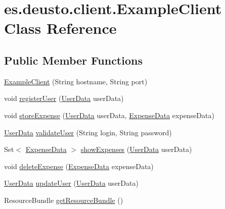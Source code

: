 \hypertarget{classes_1_1deusto_1_1client_1_1_example_client}{}\section{es.\+deusto.\+client.\+Example\+Client Class Reference}
\label{classes_1_1deusto_1_1client_1_1_example_client}
\subsection*{Public Member Functions}
\begin{DoxyCompactItemize}
\item 
\hyperlink{classes_1_1deusto_1_1client_1_1_example_client_afe4bf9d0ff661de1e0ba936df0ce807f}{Example\+Client} (String hostname, String port)
\item 
void \hyperlink{classes_1_1deusto_1_1client_1_1_example_client_a1c17371c17dde2b7664f2ad17ee79e4b}{register\+User} (\hyperlink{classes_1_1deusto_1_1serialization_1_1_user_data}{User\+Data} user\+Data)
\item 
void \hyperlink{classes_1_1deusto_1_1client_1_1_example_client_aba5fe3dfb882ef22d0bd49b5915871d3}{store\+Expense} (\hyperlink{classes_1_1deusto_1_1serialization_1_1_user_data}{User\+Data} user\+Data, \hyperlink{classes_1_1deusto_1_1serialization_1_1_expense_data}{Expense\+Data} expense\+Data)
\item 
\hyperlink{classes_1_1deusto_1_1serialization_1_1_user_data}{User\+Data} \hyperlink{classes_1_1deusto_1_1client_1_1_example_client_a740fa7000d0cd30603ce100b299ba8ba}{validate\+User} (String login, String password)
\item 
Set$<$ \hyperlink{classes_1_1deusto_1_1serialization_1_1_expense_data}{Expense\+Data} $>$ \hyperlink{classes_1_1deusto_1_1client_1_1_example_client_a527d2790290c153cae5b16133a38269a}{show\+Expenses} (\hyperlink{classes_1_1deusto_1_1serialization_1_1_user_data}{User\+Data} user\+Data)
\item 
void \hyperlink{classes_1_1deusto_1_1client_1_1_example_client_a206d3d1f399368f11a36b929af4337d4}{delete\+Expense} (\hyperlink{classes_1_1deusto_1_1serialization_1_1_expense_data}{Expense\+Data} expense\+Data)
\item 
\hyperlink{classes_1_1deusto_1_1serialization_1_1_user_data}{User\+Data} \hyperlink{classes_1_1deusto_1_1client_1_1_example_client_afbee30635a2cfe7fb7cfc58393b40bfb}{update\+User} (\hyperlink{classes_1_1deusto_1_1serialization_1_1_user_data}{User\+Data} user\+Data)
\item 
Resource\+Bundle \hyperlink{classes_1_1deusto_1_1client_1_1_example_client_a85a29c19dfbfcad9d08dcc17d688d8d3}{get\+Resource\+Bundle} ()
\end{DoxyCompactItemize}
